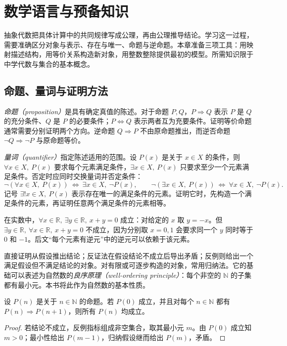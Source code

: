 \setcounter{chapter}{0} %
\chapter{数学语言与预备知识}\label{ch:preliminaries}

抽象代数把具体计算中的共同规律写成公理，再由公理推导结论。学习这一过程，需要准确区分对象与表示、存在与唯一、命题与逆命题。本章准备三项工具：用映射描述结构，用等价关系构造新对象，用整数整除提供最初的模型。所需知识限于中学代数与集合的基本概念。

\section{命题、量词与证明方法}\label{sec:logic}

\emph{命题（proposition）}是具有确定真值的陈述。对于命题 $P,Q$，$P\Rightarrow Q$ 表示 $P$ 是 $Q$ 的充分条件、$Q$ 是 $P$ 的必要条件；$P\Leftrightarrow Q$ 表示两者互为充要条件。证明等价命题通常需要分别证明两个方向。逆命题 $Q\Rightarrow P$ 不由原命题推出，而逆否命题 $\neg Q\Rightarrow\neg P$ 与原命题等价。

\emph{量词（quantifier）}指定陈述适用的范围。设 $P(x)$ 是关于 $x\in X$ 的条件，则 $\forall x\in X,\ P(x)$ 要求每个元素满足条件，$\exists x\in X,\ P(x)$ 只要求至少一个元素满足条件。否定时应同时交换量词并否定条件：
\[
  \neg(\forall x\in X,\ P(x))\ \Longleftrightarrow\
  \exists x\in X,\ \neg P(x),\qquad
  \neg(\exists x\in X,\ P(x))\ \Longleftrightarrow\
  \forall x\in X,\ \neg P(x).
\]
记号 $\exists!x\in X,\ P(x)$ 表示存在唯一的满足条件的元素。证明它时，先构造一个满足条件的元素，再证明任意两个满足条件的元素相等。

\begin{example}[量词顺序]
在实数中，$\forall x\in\mathbb R,\ \exists y\in\mathbb R,\ x+y=0$ 成立：对给定的 $x$ 取 $y=-x$。但 $\exists y\in\mathbb R,\ \forall x\in\mathbb R,\ x+y=0$ 不成立，因为分别取 $x=0,1$ 会要求同一个 $y$ 同时等于 $0$ 和 $-1$。后文“每个元素有逆元”中的逆元可以依赖于该元素。
\end{example}

直接证明从假设推出结论；反证法在假设结论不成立后导出矛盾；反例则给出一个满足假设但不满足结论的对象。对有限或可逐步构造的对象，常用归纳法。它的基础可以表述为自然数的\emph{良序原理（well-ordering principle）}：每个非空的 $\mathbb N$ 的子集都有最小元。本书将此作为自然数的基本性质。

\begin{proposition}[数学归纳法]\label{prop:induction}
设 $P(n)$ 是关于 $n\in\mathbb N$ 的命题。若 $P(0)$ 成立，并且对每个 $n\in\mathbb N$ 都有 $P(n)\Rightarrow P(n+1)$，则所有 $P(n)$ 均成立。
\end{proposition}
\begin{proof}
若结论不成立，反例指标组成非空集合，取其最小元 $m$。由 $P(0)$ 成立知 $m>0$；最小性给出 $P(m-1)$，归纳假设继而给出 $P(m)$，矛盾。
\end{proof}

